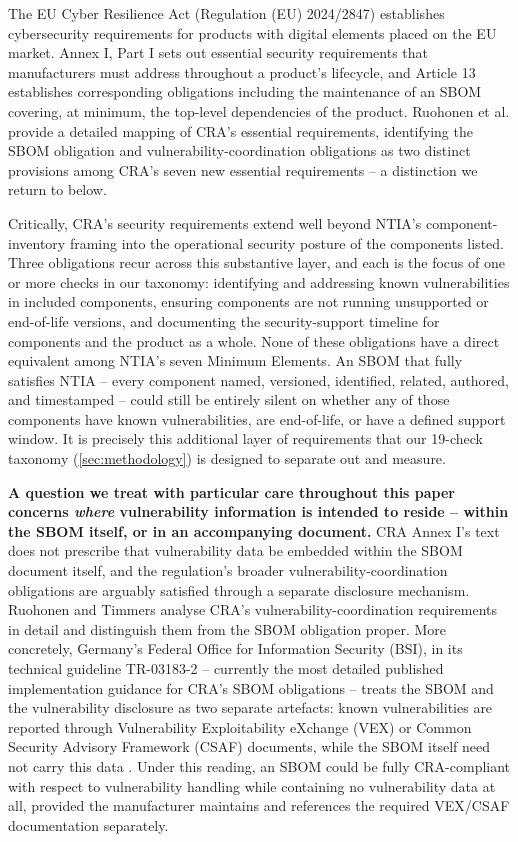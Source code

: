 \documentclass[11pt]{article}
\begin{document}
The EU Cyber Resilience Act (Regulation (EU) 2024/2847) \cite{cra2024} establishes cybersecurity requirements for products with digital elements placed on the EU market. Annex I, Part I sets out essential security requirements that manufacturers must address throughout a product's lifecycle, and Article 13 establishes corresponding obligations including the maintenance of an SBOM covering, at minimum, the top-level dependencies of the product. Ruohonen et al. \cite{ruohonen2025gdpr} provide a detailed mapping of CRA's essential requirements, identifying the SBOM obligation and vulnerability-coordination obligations as two distinct provisions among CRA's seven new essential requirements -- a distinction we return to below.

Critically, CRA's security requirements extend well beyond NTIA's component-inventory framing into the operational security posture of the components listed. Three obligations recur across this substantive layer, and each is the focus of one or more checks in our taxonomy: identifying and addressing known vulnerabilities in included components, ensuring components are not running unsupported or end-of-life versions, and documenting the security-support timeline for components and the product as a whole. None of these obligations have a direct equivalent among NTIA's seven Minimum Elements. An SBOM that fully satisfies NTIA -- every component named, versioned, identified, related, authored, and timestamped -- could still be entirely silent on whether any of those components have known vulnerabilities, are end-of-life, or have a defined support window. It is precisely this additional layer of requirements that our 19-check taxonomy (\cref{sec:methodology}) is designed to separate out and measure.

\textbf{A question we treat with particular care throughout this paper concerns \emph{where} vulnerability information is intended to reside -- within the SBOM itself, or in an accompanying document.} CRA Annex I's text does not prescribe that vulnerability data be embedded within the SBOM document itself, and the regulation's broader vulnerability-coordination obligations are arguably satisfied through a separate disclosure mechanism. Ruohonen and Timmers \cite{ruohonen2025timmers} analyse CRA's vulnerability-coordination requirements in detail and distinguish them from the SBOM obligation proper. More concretely, Germany's Federal Office for Information Security (BSI), in its technical guideline TR-03183-2 -- currently the most detailed published implementation guidance for CRA's SBOM obligations -- treats the SBOM and the vulnerability disclosure as two separate artefacts: known vulnerabilities are reported through Vulnerability Exploitability eXchange (VEX) or Common Security Advisory Framework (CSAF) documents, while the SBOM itself need not carry this data \cite{bsi2025}. Under this reading, an SBOM could be fully CRA-compliant with respect to vulnerability handling while containing no vulnerability data at all, provided the manufacturer maintains and references the required VEX/CSAF documentation separately.
\end{document}
